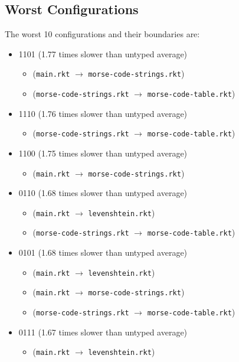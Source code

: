 \documentclass{article}
\newcommand{\mono}[1]{\texttt{#1}}
\begin{document}
\subsection{Worst Configurations}
The worst 10 configurations and their boundaries are:
\begin{itemize}
\item 1101 (1.77 times slower than untyped average)
  \begin{itemize}
  \item (\mono{main.rkt} $\rightarrow$ \mono{morse-code-strings.rkt})
  \item (\mono{morse-code-strings.rkt} $\rightarrow$ \mono{morse-code-table.rkt})
  \end{itemize}
\item 1110 (1.76 times slower than untyped average)
  \begin{itemize}
  \item (\mono{morse-code-strings.rkt} $\rightarrow$ \mono{morse-code-table.rkt})
  \end{itemize}
\item 1100 (1.75 times slower than untyped average)
  \begin{itemize}
  \item (\mono{main.rkt} $\rightarrow$ \mono{morse-code-strings.rkt})
  \end{itemize}
\item 0110 (1.68 times slower than untyped average)
  \begin{itemize}
  \item (\mono{main.rkt} $\rightarrow$ \mono{levenshtein.rkt})
  \item (\mono{morse-code-strings.rkt} $\rightarrow$ \mono{morse-code-table.rkt})
  \end{itemize}
\item 0101 (1.68 times slower than untyped average)
  \begin{itemize}
  \item (\mono{main.rkt} $\rightarrow$ \mono{levenshtein.rkt})
  \item (\mono{main.rkt} $\rightarrow$ \mono{morse-code-strings.rkt})
  \item (\mono{morse-code-strings.rkt} $\rightarrow$ \mono{morse-code-table.rkt})
  \end{itemize}
\item 0111 (1.67 times slower than untyped average)
  \begin{itemize}
  \item (\mono{main.rkt} $\rightarrow$ \mono{levenshtein.rkt})

\end{itemize}
\end{itemize}
\end{document}
